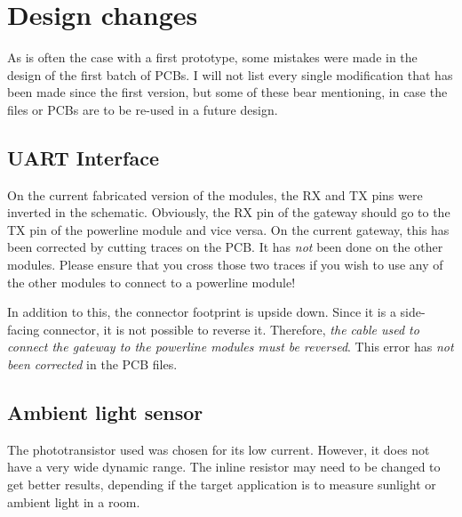


\pagebreak
\appendix

\section{Design changes}
\label{sec:design-changes}

As is often the case with a first prototype, some mistakes were made in the
design of the first batch of PCBs. I will not list every single modification
that has been made since the first version, but some of these bear mentioning,
in case the files or PCBs are to be re-used in a future design.

\subsection{UART Interface}
On the current fabricated version of the modules, the RX and TX pins were
inverted in the schematic. Obviously, the RX pin of the gateway should go to the
TX pin of the powerline module and vice versa. On the current gateway, this has
been corrected by cutting traces on the PCB. It has \emph{not} been done on the
other modules. Please ensure that you cross those two traces if you wish to use
any of the other modules to connect to a powerline module!

In addition to this, the connector footprint is upside down. Since it is a
side-facing connector, it is not possible to reverse it. Therefore, \emph{the
cable used to connect the gateway to the powerline modules must be reversed}.
This error has \emph{not been corrected} in the PCB files.

\subsection{Ambient light sensor}
The phototransistor used was chosen for its low current. However, it does not
have a very wide dynamic range. The inline resistor may need to be changed to
get better results, depending if the target application is to measure sunlight
or ambient light in a room.

